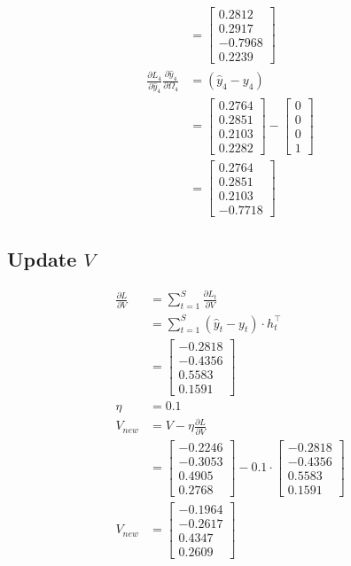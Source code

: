 \documentclass{article}
\begin{document}
\begin{align*}
&= \begin{bmatrix} 0.2812 \\ 0.2917 \\ -0.7968 \\ 0.2239 \end{bmatrix}\\
\frac{\partial L_4}{\partial \hat{y}_4}\frac{\partial \hat{y}_4}{\partial \Omega_4} &= (\hat{y}_{4}-y_{4})\\
&=\begin{bmatrix} 0.2764 \\ 0.2851 \\ 0.2103 \\ 0.2282 \end{bmatrix}-\begin{bmatrix} 0 \\ 0 \\ 0 \\ 1 \end{bmatrix} \\
&= \begin{bmatrix} 0.2764 \\ 0.2851 \\ 0.2103 \\ -0.7718 \end{bmatrix}
\end{align*}
\subsection{Update $V$}
\begin{align*} 
\frac{\partial L}{\partial V} &= \sum_{t=1}^{S} \frac{\partial L_{t}}{\partial V} \\
&=\sum_{t=1}^{S} (\hat{y}_{t} - y_{t}) \cdot h_{t}^\top\\
&= \begin{bmatrix}
-0.2818 \\
-0.4356 \\
0.5583 \\
0.1591
\end{bmatrix}\\
\eta &= 0.1\\
V_{new} &= V - \eta \frac{\partial L}{\partial V}\\
 &= \begin{bmatrix}
    -0.2246 \\
    -0.3053 \\
    0.4905 \\
    0.2768
\end{bmatrix} - 0.1 \cdot\begin{bmatrix}
-0.2818 \\
-0.4356 \\
0.5583 \\
0.1591
\end{bmatrix} \\
V_{new} &= \begin{bmatrix}
-0.1964 \\
-0.2617 \\
0.4347 \\
0.2609
\end{bmatrix}
\end{align*}
\end{document}
